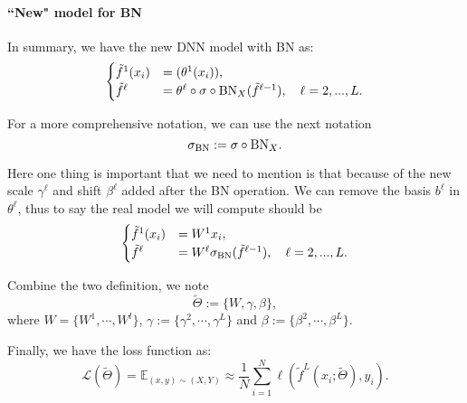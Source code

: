 \paragraph{``New" model for BN}
In summary, we have the new DNN model with BN as:
\begin{equation}\label{nn-BN0}
\begin{cases}
\tilde f^1(x_i)&= (\theta^1 (x_i) ),\\
\tilde f^\ell &= \theta^{\ell} \circ \sigma \circ {\rm BN}_{ X}(\tilde f^{\ell-1}), \quad  \ell=2,...,L.
\end{cases}
\end{equation}

For a more comprehensive notation, 
we can use the next notation
\begin{equation}
\sigma_{\rm BN} := \sigma \circ {\rm BN}_{ X}.
\end{equation}

Here one thing is important that we need to mention is that because of the new
scale $\gamma^\ell$ and shift $\beta^\ell$ added after the BN operation. 
We can remove the basis $b^\ell$ in $\theta^\ell$, thus to say the real model we will compute should be
\begin{equation}\label{nn-BN}
\begin{cases}
\tilde f^1(x_i)&= W^1 x_i ,\\
\tilde f^\ell &= W^{\ell}  \sigma_{\rm BN}(\tilde f^{\ell-1}), \quad  \ell=2,...,L.
\end{cases}
\end{equation}

Combine the two definition, we note
\begin{equation}
\tilde \Theta := \{W, \gamma, \beta\},
\end{equation}
where
$W = \{W^1, \cdots, W^l \}$, $\gamma := \{\gamma^2, \cdots, \gamma^L\}$ and $\beta := \{\beta^2, \cdots, \beta^L\}$.


Finally, we have the loss function as:
\begin{equation}\label{eq:loss-BN}
\mathcal L(\tilde \Theta) = \mathbb{E}_{(x,y)\sim (X,Y)} \approx \frac{1}{N}\sum_{i=1}^N \ell(\tilde f^L(x_i; \tilde \Theta), y_i).
\end{equation}

